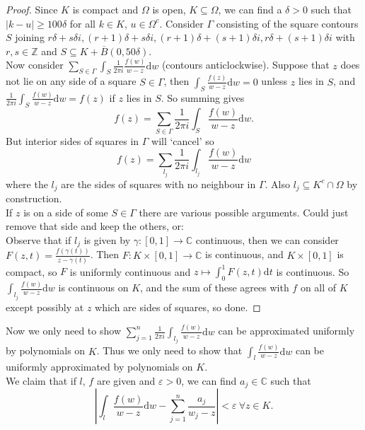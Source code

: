 \documentclass[a4paper, 10pt, twocolumn]{amsart}
\theoremstyle{definition}
\newcommand{\bb}[1]{\mathbb{#1}}
\newcommand{\eps}[0]{\varepsilon}
\newcommand{\sbs}[0]{\subseteq}
\newcommand{\1}{\mathbbm{1}}
\begin{document}
\begin{proof}
    Since $K$ is compact and $\Omega$ is open, $K \sbs \Omega$, we can find a $\delta>0$ such that $|k-u| \ge 100\delta$ for all $k \in K$, $u \in \Omega^c$. Consider $\Gamma$ consisting of the square contours $S$ joining $r\delta+s\delta i,(r+1)\delta+s\delta i,(r+1)\delta+(s+1)\delta i,r\delta+(s+1)\delta i$ with $r,s \in \bb{Z}$ and $S \sbs K+\overline{B}(0,50\delta)$.\\

    Now consider $\sum_{S \in \Gamma} \int_S \frac{1}{2\pi i} \frac{f(w)}{w-z} \mathrm{d}w$ (contours anticlockwise). Suppose that $z$ does not lie on any side of a square $S \in \Gamma$, then $\int_S \frac{f(z)}{w-z} \mathrm{d}w = 0$ unless $z$ lies in $S$, and $\frac{1}{2\pi i} \int_S \frac{f(w)}{w-z} \mathrm{d}w = f(z)$ if $z$ lies in $S$. So summing gives \[f(z) = \sum_{S \in \Gamma} \frac{1}{2\pi i}\int_S \frac{f(w)}{w-z} \mathrm{d}w.\]
    But interior sides of squares in $\Gamma$ will `cancel' so \[f(z) = \sum_{l_j} \frac{1}{2\pi i} \int_{l_j} \frac{f(w)}{w-z} \mathrm{d}w\]
    where the $l_j$ are the sides of squares with no neighbour in $\Gamma$. Also $l_j \sbs K^c \cap \Omega$ by construction.\\

    If $z$ is on a side of some $S \in \Gamma$ there are various possible arguments. Could just remove that side and keep the others, or:\\
    
    Observe that if $l_j$ is given by $\gamma:[0,1] \to \bb{C}$ continuous, then we can consider $F(z,t) = \frac{f(\gamma(t))}{z-\gamma(t)}$. Then $F: K \times [0,1] \to \bb{C}$ is continuous, and $K \times [0,1]$ is compact, so $F$ is uniformly continuous and $z\mapsto \int_0^1 F(z,t)\mathrm{d}t$ is continuous. So $\int_{l_j} \frac{f(w)}{w-z} \mathrm{d}w$ is continuous on $K$, and the sum of these agrees with $f$ on all of $K$ except possibly at $z$ which are sides of squares, so done.
\end{proof}

Now we only need to show $\sum_{j=1}^n \frac{1}{2\pi i} \int_{l_j} \frac{f(w)}{w-z} \mathrm{d}w$ can be approximated uniformly by polynomials on $K$. Thus we only need to show that $\int_{l} \frac{f(w)}{w-z}\mathrm{d}w$ can be uniformly approximated by polynomials on $K$. \\

We claim that if $l$, $f$ are given and $\eps>0$, we can find $a_j \in \bb{C}$ such that \[\left|\int_{l} \frac{f(w)}{w-z} \mathrm{d}w - \sum_{j=1}^n \frac{a_j}{w_j-z} \right| < \eps \ \forall z \in K.\]
\end{document}
